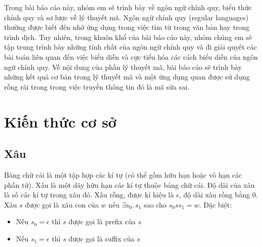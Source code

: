 \documentclass[14pt]{extreport}
\begin{document}
Trong bài báo cáo này, nhóm em sẽ trình bày về ngôn ngữ chính quy, biểu thức chính quy và sơ lược về lý thuyết mã. Ngôn ngữ chính quy (regular languages) thường được biết đên nhờ ứng dụng trong việc tìm từ trong văn bản hay trong trình dịch. Tuy nhiên, trong khuôn khổ của bài báo cáo này, nhóm chúng em sẽ tập trung trình bày những tính chất của ngôn ngữ chính quy và đi giải quyết các bài toán liên quan đến việc biểu diễn và cực tiểu hóa các cách biểu diễn của ngôn ngữ chính quy. Về nội dung của phần lý thuyết mã, bài báo cáo sẽ trình bày những kết quả cơ bản trong lý thuyết mã và một ứng dụng quan được sử dụng rỗng rãi trong trong việc truyền thông tin đó là mã sửa sai.


\chapter{Kiến thức cơ sở}
\section{Xâu}
Bảng chữ cái là một tập hợp các kí tự (có thể gồm hữu hạn hoặc vô hạn các phần tử). Xâu là một dãy hữu hạn các kí tự thuộc bảng chữ cái. Độ dài của xâu là số các kí tự trong xâu đó. Xấu rỗng, được kí hiệu là $\epsilon$, độ dài xâu rồng bằng 0.\\
Xâu $s$ được gọi là xâu con của $w$ nếu $\exists s_0, s_1$ sao cho $s_0ss_1 = w$. Đặc biệt:
\begin{itemize}
\item Nếu $s_0 =\epsilon$ thì $s$ được gọi là prefix của $s$
\item Nếu $s_1 =\epsilon$ thì $s$ được gọi là suffix của $s$
\end{itemize}
\end{document}
